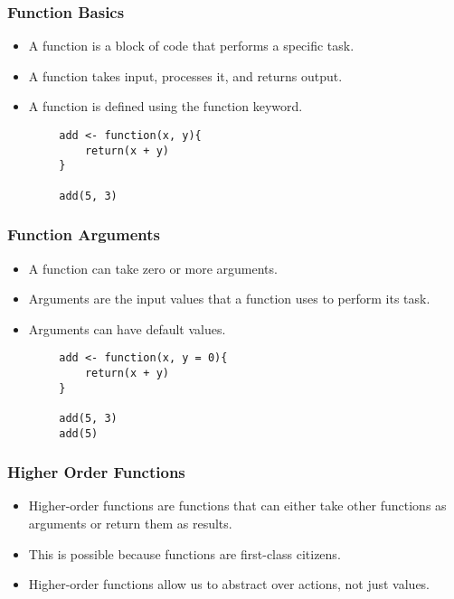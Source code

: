 \documentclass[serif, 9pt, aspectratio=32]{beamer}
\begin{document}
\begin{frame}
    \centering
    \frametitle{Function Basics}
    \begin{itemize}
        \setlength{\itemsep}{2em}
        \item A function is a block of code that performs a specific task.
        \item A function takes input, processes it, and returns output.
        \item A function is defined using the function keyword.
    \end{itemize}
\end{frame}

\begin{frame}[fragile]
    \begin{lstlisting}
        add <- function(x, y){
            return(x + y)
        }

        add(5, 3)
    \end{lstlisting}
\end{frame}

\begin{frame}
    \centering
    \frametitle{Function Arguments}
    \begin{itemize}
        \setlength{\itemsep}{2em}
        \item A function can take zero or more arguments.
        \item Arguments are the input values that a function uses to perform its task.
        \item Arguments can have default values.
    \end{itemize}
\end{frame}

\begin{frame}[fragile]
    \begin{lstlisting}
        add <- function(x, y = 0){
            return(x + y)
        }

        add(5, 3)
        add(5)
    \end{lstlisting}
\end{frame}

\begin{frame}
    \centering
    \frametitle{Higher Order Functions}
    \begin{itemize}
        \setlength{\itemsep}{2em}
        \item Higher-order functions are functions that can either take other functions as arguments or return them as results.
        \item This is possible because functions are first-class citizens.
        \item Higher-order functions allow us to abstract over actions, not just values.
    \end{itemize}
\end{frame}
\end{document}
